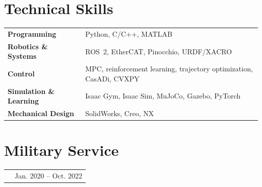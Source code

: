 \documentclass[letterpaper,10pt]{article}
\makeatletter
\newcommand{\datedline}[2]{%
  \par\noindent
  \begin{tabularx}{\linewidth}{@{}>{\raggedright\arraybackslash}X@{\hspace{1em}}r@{}}
    #1 & {\small #2}
  \end{tabularx}\par\nopagebreak
}
\newcommand{\project}[2]{\datedline{{\fontsize{10.5}{12}\selectfont\bfseries #1}}{#2}}
\makeatother
\begin{document}
\section{Technical Skills}

\begin{tabularx}{\textwidth}{@{}l X@{}}
\textbf{Programming} & Python, C/C++, MATLAB \\
\textbf{Robotics \& Systems} & ROS~2, EtherCAT, Pinocchio, URDF/XACRO \\
\textbf{Control} & MPC, reinforcement learning, trajectory optimization, CasADi, CVXPY \\
\textbf{Simulation \& Learning} & Isaac Gym, Isaac Sim, MuJoCo, Gazebo, PyTorch \\
\textbf{Mechanical Design} & SolidWorks, Creo, NX
\end{tabularx}

\renewcommand{\arraystretch}{1}
\section{Military Service}

\project{Mandatory Military Service, Republic of Korea}{Jan. 2020 -- Oct. 2022}
\end{document}
